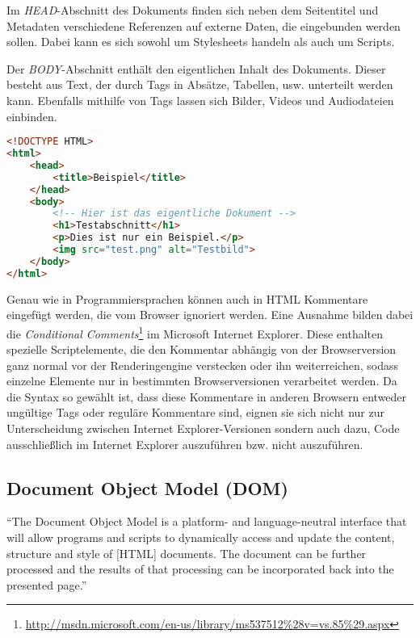 Im \emph{HEAD}-Abschnitt des Dokuments finden sich neben dem Seitentitel und Metadaten verschiedene
Referenzen auf externe Daten, die eingebunden werden sollen. Dabei kann es sich sowohl um
Stylesheets handeln als auch um Scripts.

Der \emph{BODY}-Abschnitt enthält den eigentlichen Inhalt des Dokuments. Dieser besteht aus Text,
der durch Tags in Absätze, Tabellen, usw. unterteilt werden kann. Ebenfalls mithilfe von Tags lassen
sich Bilder, Videos und Audiodateien einbinden.

\begin{lstlisting}[language=HTML,caption=Ein HTML5-Dokument]
<!DOCTYPE HTML>
<html>
    <head>
        <title>Beispiel</title>
    </head>
    <body>
        <!-- Hier ist das eigentliche Dokument -->
        <h1>Testabschnitt</h1>
        <p>Dies ist nur ein Beispiel.</p>
        <img src="test.png" alt="Testbild">
    </body>
</html>
\end{lstlisting}

Genau wie in Programmiersprachen können auch in HTML Kommentare eingefügt werden, die vom Browser
ignoriert werden. Eine Ausnahme bilden dabei die \emph{Conditional
Comments}\footnote{\href{http://msdn.microsoft.com/en-us/library/ms537512\%28v=vs.85\%29.aspx}{http://msdn.microsoft.com/en-us/library/ms537512\%28v=vs.85\%29.aspx}}
im Microsoft Internet Explorer. Diese enthalten spezielle Scriptelemente, die den Kommentar abhängig
von der Browserversion ganz normal vor der Renderingengine verstecken oder ihn weiterreichen, sodass
einzelne Elemente nur in bestimmten Browserversionen verarbeitet werden. Da die Syntax so gewählt
ist, dass diese Kommentare in anderen Browsern entweder ungültige Tags oder reguläre Kommentare
sind, eignen sie sich nicht nur zur Unterscheidung zwischen Internet Explorer-Versionen sondern auch
dazu, Code ausschließlich im Internet Explorer auszuführen bzw. nicht auszuführen.


\subsection{Document Object Model (DOM)}
\enquote{The Document Object Model is a platform- and language-neutral interface that will allow
programs and scripts to dynamically access and update the content, structure and style of [HTML]
documents. The document can be further processed and the results of that processing can be
incorporated back into the presented page.} \citep{w3c:dom-old}

